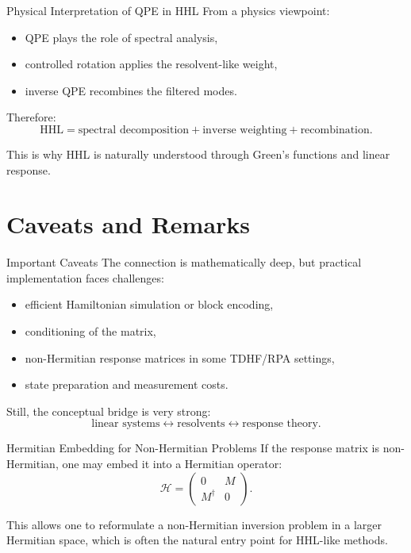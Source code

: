 \documentclass{beamer}
\begin{document}

\begin{frame}{Physical Interpretation of QPE in HHL}
From a physics viewpoint:
\begin{itemize}
\item QPE plays the role of spectral analysis,
\item controlled rotation applies the resolvent-like weight,
\item inverse QPE recombines the filtered modes.
\end{itemize}

Therefore:
\[
\text{HHL} = \text{spectral decomposition} + \text{inverse weighting} + \text{recombination}.
\]

This is why HHL is naturally understood through Green's functions and linear response.
\end{frame}

\section{Caveats and Remarks}

\begin{frame}{Important Caveats}
The connection is mathematically deep, but practical implementation faces challenges:
\begin{itemize}
\item efficient Hamiltonian simulation or block encoding,
\item conditioning of the matrix,
\item non-Hermitian response matrices in some TDHF/RPA settings,
\item state preparation and measurement costs.
\end{itemize}

Still, the conceptual bridge is very strong:
\[
\text{linear systems} \leftrightarrow \text{resolvents} \leftrightarrow \text{response theory}.
\]
\end{frame}


\begin{frame}{Hermitian Embedding for Non-Hermitian Problems}
If the response matrix is non-Hermitian, one may embed it into a Hermitian operator:
\[
\mathcal{H}
=
\begin{pmatrix}
0 & M \\
M^\dagger & 0
\end{pmatrix}.
\]

This allows one to reformulate a non-Hermitian inversion problem in a larger Hermitian space, which is often the natural entry point for HHL-like methods.
\end{frame}
\end{document}
